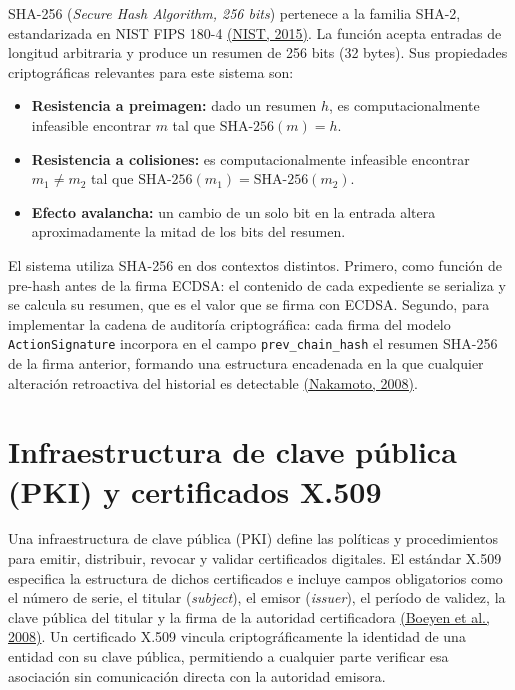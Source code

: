 \documentclass[10pt,letterpaper]{report}
\newcommand{\citeref}[2]{\hyperlink{ref:#1}{(#2)}}
\begin{document}
SHA-256 (\textit{Secure Hash Algorithm, 256 bits}) pertenece a la familia SHA-2, estandarizada en NIST FIPS 180-4 \citeref{nist2015sha}{NIST, 2015}. La función acepta entradas de longitud arbitraria y produce un resumen de 256 bits (32 bytes). Sus propiedades criptográficas relevantes para este sistema son:
\begin{itemize}[leftmargin=*]
    \item \textbf{Resistencia a preimagen:} dado un resumen $h$, es computacionalmente infeasible encontrar $m$ tal que $\text{SHA-256}(m) = h$.
    \item \textbf{Resistencia a colisiones:} es computacionalmente infeasible encontrar $m_1 \neq m_2$ tal que $\text{SHA-256}(m_1) = \text{SHA-256}(m_2)$.
    \item \textbf{Efecto avalancha:} un cambio de un solo bit en la entrada altera aproximadamente la mitad de los bits del resumen.
\end{itemize}

El sistema utiliza SHA-256 en dos contextos distintos. Primero, como función de pre-hash antes de la firma ECDSA: el contenido de cada expediente se serializa y se calcula su resumen, que es el valor que se firma con ECDSA. Segundo, para implementar la cadena de auditoría criptográfica: cada firma del modelo \texttt{ActionSignature} incorpora en el campo \texttt{prev\_chain\_hash} el resumen SHA-256 de la firma anterior, formando una estructura encadenada en la que cualquier alteración retroactiva del historial es detectable \citeref{nakamoto2008}{Nakamoto, 2008}.

\section{Infraestructura de clave pública (PKI) y certificados X.509}

Una infraestructura de clave pública (PKI) define las políticas y procedimientos para emitir, distribuir, revocar y validar certificados digitales. El estándar X.509 especifica la estructura de dichos certificados e incluye campos obligatorios como el número de serie, el titular (\textit{subject}), el emisor (\textit{issuer}), el período de validez, la clave pública del titular y la firma de la autoridad certificadora \citeref{boeyen2008}{Boeyen et al., 2008}. Un certificado X.509 vincula criptográficamente la identidad de una entidad con su clave pública, permitiendo a cualquier parte verificar esa asociación sin comunicación directa con la autoridad emisora.
\end{document}
